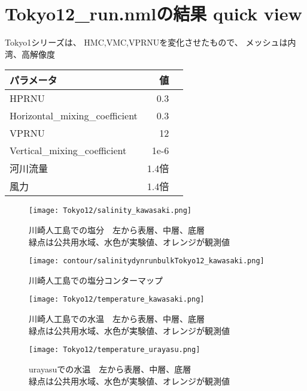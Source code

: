 \documentclass[fontsize=12pt,paper=a4]{jlreq}
\begin{document}
\section{Tokyo12\_run.nmlの結果 quick view}
Tokyo1シリーズは、 HMC,VMC,VPRNUを変化させたもので、
メッシュは内湾、高解像度
\begin{table}
  \begin{minipage}[hbtp]{0.5\hsize}
    \begin{tabular}{lrr} \toprule
      パラメータ & 値 \\ \midrule
      HPRNU & 0.3\\
      Horizontal\_mixing\_coefficient & 0.3\\
      VPRNU & 12\\
      Vertical\_mixing\_coefficient & 1e-6\\
      河川流量 & 1.4倍 \\
      風力 & 1.4倍\\ \bottomrule
    \end{tabular}
  \end{minipage}
\end{table}

\begin{figure}[hbtp]
        \centering
        \texttt{[image: Tokyo12/salinity\_kawasaki.png]}
        \caption{川崎人工島での塩分　左から表層、中層、底層\\緑点は公共用水域、水色が実験値、オレンジが観測値}
\end{figure}

\begin{figure}[hbtp]
        \centering
        \texttt{[image: contour/salinitydynrunbulkTokyo12\_kawasaki.png]}
        \caption{川崎人工島での塩分コンターマップ}
\end{figure}


\begin{figure}[hbtp]
        \centering
        \texttt{[image: Tokyo12/temperature\_kawasaki.png]}
        \caption{川崎人工島での水温　左から表層、中層、底層\\緑点は公共用水域、水色が実験値、オレンジが観測値}
\end{figure}
\begin{figure}[hbtp]
  \centering
  \texttt{[image: Tokyo12/temperature\_urayasu.png]}
  \caption{urayasuでの水温　左から表層、中層、底層\\緑点は公共用水域、水色が実験値、オレンジが観測値}
\end{figure}
\end{document}
